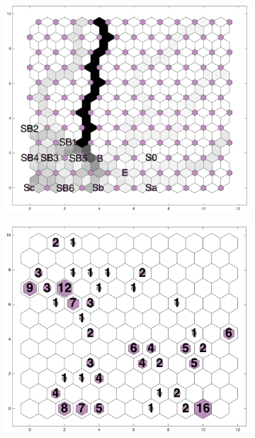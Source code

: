 \begin{figure}
\begin{subfigure}[b]{0.45\textwidth}
            \includegraphics[width=\textwidth]{images0.01/2d/dist_12_by_self_org_res12.png}
        \end{subfigure}
        \hfill
        \begin{subfigure}[b]{0.45\textwidth}
            \includegraphics[width=\textwidth]{images0.01/2d/hit_v_12_by_12.png}
        \end{subfigure}
        \hfill
        \begin{subfigure}[b]{0.45\textwidth}

\end{subfigure}
\end{figure}
